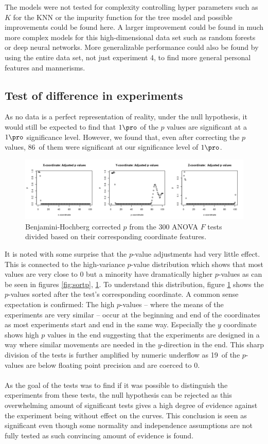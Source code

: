 \documentclass[11pt,fleqn]{article}
\begin{document}
The models were not tested for complexity controlling hyper parameters such as \(K\) for the KNN or the impurity function for the tree model and possible improvements could be found here. A larger improvement could be found in much more complex models for this high-dimensional data set such as random forests or deep neural networks. More generalizable performance could also be found by using the entire data set, not just experiment 4, to find more general personal  features and mannerisms.

\subsection{Test of difference in experiments}
As no data is a perfect representation of reality, under the null hypothesis, it would still be expected to find that $ 1\pro $ of the $ p $ values are significant at a $ 1\pro $ significance level. However, we found that, even after correcting the $ p $ values, 86\pro\ of them were significant at our significance level of $ 1\pro $.
\begin{figure}[H]
	\centering
	\includegraphics[width=.8\textwidth]{coordinate_ps}
	\caption{Benjamini-Hochberg corrected $ p $ from the 300 ANOVA \(F\) tests divided based on their corresponding coordinate features.}\label{fig:unsortp}
\end{figure}\noindent 
It is noted with some surprise that the \(p\)-value adjustments had very little effect. This is connected to the high-variance \(p\)-value distribution which shows that most values are very close to 0 but a minority have dramatically higher \(p\)-values as can be seen in figures \ref{fig:sortp}, \ref{fig:unsortp}. To understand this distribution, figure \ref{fig:unsortp} shows the \(p\)-values sorted after the test's corresponding coordinate.  
A common sense expectation is confirmed: The high \(p\)-values -- where the means of the experiments are very similar -- occur at the beginning and end of the coordinates as most experiments start and end in the same way. 
Especially the \(y\) coordinate shows high \(p\) values in the end suggesting that the experiments are designed in a way where similar movements are needed in the \(y\)-direction in the end. 
This sharp division of the tests is further amplified by numeric underflow as 19\pro\ of the \(p\)-values are below floating point precision and are coerced to 0.
\\\\
As the goal of the tests was to find if it was possible to distinguish the experiments from these tests, the null hypothesis can be rejected as this overwhelming amount of significant tests gives a high degree of evidence against the experiment being without effect on the curves.
This conclusion is seen as significant even though some normality and independence assumptions are not fully tested as such convincing amount of evidence is found.
 
\end{document}
